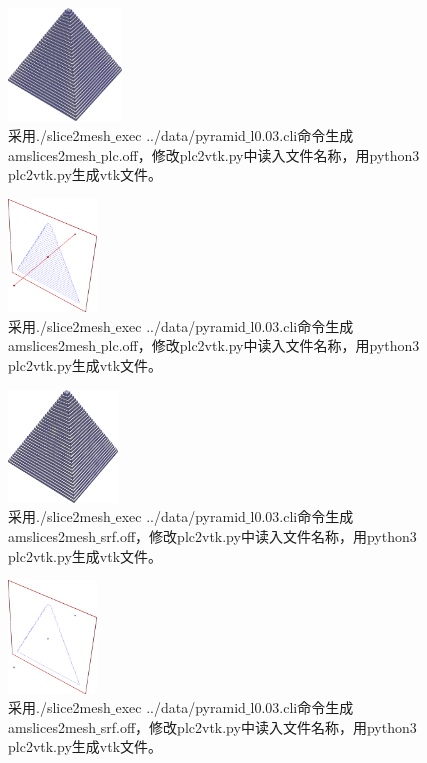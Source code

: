 \begin{figure}[!htbp]
  \centering
  \includegraphics[height=3cm]{fig/1/1.1.7.1:1.png}
  \caption{采用./slice2mesh$\_$exec ../data/pyramid$\_$l0.03.cli命令生成amslices2mesh$\_$plc.off，修改plc2vtk.py中读入文件名称，用python3 plc2vtk.py生成vtk文件。}
  \label{fig:1-7}
\end{figure}

\begin{figure}[!htbp]
  \centering
  \includegraphics[height=3cm]{fig/1/1.1.7.1:2.png}
  \caption{采用./slice2mesh$\_$exec ../data/pyramid$\_$l0.03.cli命令生成amslices2mesh$\_$plc.off，修改plc2vtk.py中读入文件名称，用python3 plc2vtk.py生成vtk文件。}
  \label{fig:1-7}
\end{figure}

\begin{figure}[!htbp]
  \centering
  \includegraphics[height=3cm]{fig/1/1.1.7.1:3.png}
  \caption{采用./slice2mesh$\_$exec ../data/pyramid$\_$l0.03.cli命令生成amslices2mesh$\_$srf.off，修改plc2vtk.py中读入文件名称，用python3 plc2vtk.py生成vtk文件。}
  \label{fig:1-7}
\end{figure}

\begin{figure}[!htbp]
  \centering
  \includegraphics[height=3cm]{fig/1/1.1.7.1:4.png}
  \caption{采用./slice2mesh$\_$exec ../data/pyramid$\_$l0.03.cli命令生成amslices2mesh$\_$srf.off，修改plc2vtk.py中读入文件名称，用python3 plc2vtk.py生成vtk文件。}
  \label{fig:1-7}
\end{figure}


